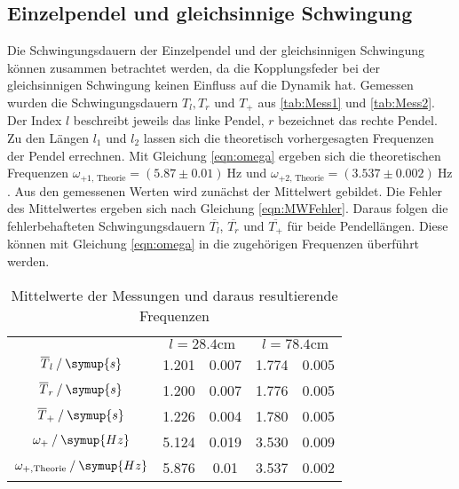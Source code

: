\subsection{Einzelpendel und gleichsinnige Schwingung}
\label{subsec:Gleichsinnig}
Die Schwingungsdauern der Einzelpendel und der gleichsinnigen Schwingung können zusammen betrachtet werden, da die Kopplungsfeder bei der gleichsinnigen Schwingung 
keinen Einfluss auf die Dynamik hat. Gemessen wurden die Schwingungsdauern $T_l, T_r$ und $T_+$ aus \autoref{tab:Mess1} und \autoref{tab:Mess2}.
Der Index $l$ beschreibt jeweils das linke Pendel, $r$ bezeichnet das rechte Pendel. Zu den Längen $l_1$ und $l_2$ lassen sich die 
theoretisch vorhergesagten Frequenzen der Pendel errechnen. Mit Gleichung \eqref{eqn:omega} ergeben sich die theoretischen Frequenzen $\omega_{+1\text{, Theorie}} = (5.87\pm 0.01)\:\unit{\hertz}$ und 
$\omega_{+2\text{, Theorie}} = (3.537\pm 0.002)\:\unit{\hertz}$. Aus den gemessenen Werten wird zunächst der Mittelwert gebildet. Die Fehler des Mittelwertes ergeben sich nach Gleichung \eqref{eqn:MWFehler}.
Daraus folgen die fehlerbehafteten Schwingungsdauern $\overline{T_l}$, $\overline{T_r}$ und $\overline{T_+}$ für beide Pendellängen. Diese können mit Gleichung \eqref{eqn:omega} in 
die zugehörigen Frequenzen überführt werden.
\begin{table}
    \centering
    \caption{Mittelwerte der Messungen und daraus resultierende Frequenzen}
    \begin{tabular}{c S @{${}\pm{}$} S S @{${}\pm{}$} S}
    \toprule
    &  &  \\
    \cmidrule(lr){2-3}\cmidrule(lr){4-5}
    {$\overline{T}_l \mathbin{/} \symup{s}$}                & 1.201 & 0.007 & 1.774 & 0.005 \\
    {$\overline{T}_r \mathbin{/} \symup{s}$}                & 1.200 & 0.007 & 1.776 & 0.005 \\
    {$\overline{T}_+ \mathbin{/} \symup{s}$}                & 1.226 & 0.004 & 1.780 & 0.005 \\
    {$\omega_+ \mathbin{/} \symup{Hz}$}                     & 5.124 & 0.019 & 3.530 & 0.009 \\
    {$\omega_{+,\text{Theorie}} \mathbin{/} \symup{Hz}$}    & 5.876 & 0.01  & 3.537 & 0.002 \\
    \bottomrule
    \end{tabular}
\end{table}    

